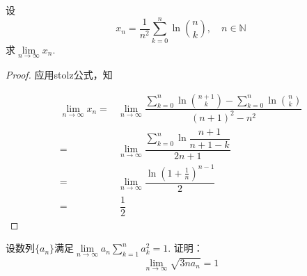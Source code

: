 \begin{proposition}
    
    设
    \[x_n = \dfrac{1}{n^2} \sum\limits_{k = 0}^{n}{\ln{\binom{n}{k}}}, \quad n \in \mathbb{N}\]
    求$\lim\limits_{n \to \infty}{x_n}$.

\end{proposition}

\begin{proof}
    
    应用\textup{stolz}公式，知

    \begin{align*}
        \lim\limits_{n \to \infty}{x_n}  = & \lim\limits_{n \to \infty}{\dfrac{\sum\limits_{k = 0}^{n}{\ln{\binom{n + 1}{k}}} - \sum\limits_{k = 0}^{n}{\ln{\binom{n}{k}}}}{(n + 1)^2 - n^2}} \\
        = & \lim\limits_{n \to \infty}{\dfrac{\sum\limits_{k = 0}^{n}{\ln{\dfrac{n + 1}{n + 1 - k}}}}{2n + 1}} \\
        = & \lim\limits_{n \to \infty}{\dfrac{\ln{(1 + \frac{1}{n})^{n - 1}}}{2}} \\
        = & \ \dfrac{1}{2}
    \end{align*}

\end{proof}

\begin{proposition}
    
    设数列$\{a_n\}$满足$\lim\limits_{n \to \infty}{a_n \sum\limits_{k  = 1}^{n}{a_k^2}} = 1$. 证明：
    \[\lim\limits_{n \to \infty}{\sqrt{3na_n}} = 1\]

\end{proposition}

